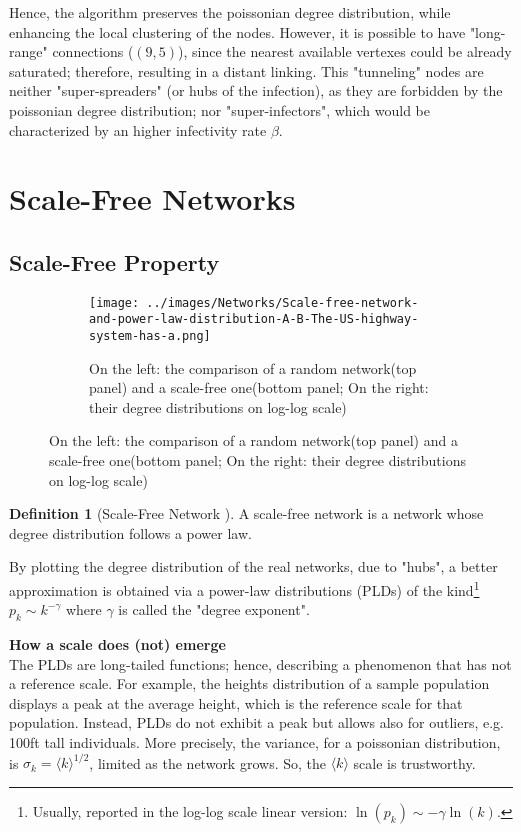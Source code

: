 \documentclass[a4paper,10pt,twoside]{book} %
\theoremstyle{definition}
\newtheorem{definition}{Definition}[section]
\begin{document}
Hence, the algorithm preserves the poissonian degree distribution, while enhancing the local clustering of the nodes. However, it is possible to have "long-range" connections ($(9,5)$), since the nearest available vertexes could be already saturated; therefore, resulting in a distant linking. This "tunneling" nodes are neither "super-spreaders" (or hubs of the infection), as they are forbidden by the poissonian degree distribution; nor "super-infectors", which would be characterized by an higher infectivity rate $\beta$.

\newpage
\section{Scale-Free Networks}
\subsection{Scale-Free Property}

\begin{figure}[h]
    \begin{subfigure}{\textwidth}
        \texttt{[image: ../images/Networks/Scale-free-network-and-power-law-distribution-A-B-The-US-highway-system-has-a.png]}
        \centering
        \caption{On the left: the comparison of a random network(top panel) and a scale-free one(bottom panel; On the right: their degree distributions on log-log scale) \cite{barabasi::2016networkbook}}
        \label{fig:PLDsVSEBDs}
    \end{subfigure}
\end{figure}

\begin{definition}[Scale-Free Network \cite{Barabasi:1999_ScalRndNet}]
	A scale-free network is a network whose degree distribution follows a power law.
\end{definition}

By plotting the degree distribution of the real networks, due to "hubs", a better approximation is obtained via a power-law distributions (PLDs) of the kind\footnote{Usually, reported in the log-log scale linear version: $\ln(p_k) \sim -\gamma \ln(k)$.} $p_k \sim k^{-\gamma}$  where $\gamma$ is called the "degree exponent". 

{\large \textbf{How a scale does (not) emerge}} \\
The PLDs are long-tailed functions; hence, describing a phenomenon that has not a reference scale.
For example, the heights distribution of a sample population displays a peak at the average height, which is the reference scale for that population. Instead, PLDs do not exhibit a peak but allows also for outliers, e.g. 100ft tall individuals.
More precisely, the variance, for a poissonian distribution, is $\sigma_k = \langle k \rangle ^ {1/2}$, limited as the network grows. So, the $\langle k \rangle$ scale is trustworthy. 
\end{document}

